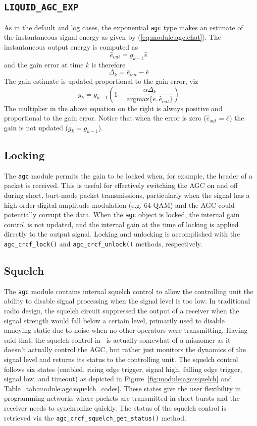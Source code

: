 \subsection{{\tt LIQUID\_AGC\_EXP}}
\label{module:agc:exp}
As in the default and log cases, the exponential {\tt agc} type makes an
estimate of the instantaneous signal energy as given by
(\ref{eq:module:agc:ehat}).
The instantaneous output energy is computed as
\[
    \hat{e}_{out} = g_{k-1} \hat{e}
\]
and the gain error at time $k$ is therefore
\[
    \Delta_k = \hat{e}_{out} - \bar{e}
\]
The gain estimate is updated proportional to the gain error, viz
\[
    g_k =
        g_{k-1} \left(1 -
         \frac{
            \alpha \Delta_k
        }{
            \text{argmax}\bigl\{\bar{e}, \hat{e}_{out} \bigr\}
        }
    \right)
\]
The multiplier in the above equation on the right is always positive and
proportional to the gain error.
Notice that when the error is zero ($\hat{e}_{out} = \bar{e}$) the gain is not
updated ($g_k = g_{k-1}$).


\subsection{Locking}
The {\tt agc} module permits the gain to be locked when, for example, the
header of a packet is received.
This is useful for effectively switching the AGC on and off during short,
burt-mode packet transmissions, particularly when the signal has a high-order
digital amplitude-modulation (e.g. 64-QAM) and the AGC could potentially
corrupt the data.
When the {\tt agc} object is locked, the internal gain control is not updated,
and the internal gain at the time of locking is applied directly to the output
signal.
%
Locking and unlocking is accomplished with the
{\tt agc\_crcf\_lock()} and
{\tt agc\_crcf\_unlock()} methods, respectively.

\subsection{Squelch}
The {\tt agc} module contains internal squelch control to allow the
controlling unit the ability to disable signal processing when the signal
level is too low.
In traditional radio design, the squelch circuit suppressed the
output of a receiver when the signal strength would fall below a certain level,
primarily used to disable annoying static due to noise when no other operators
were transmitting.
Having said that, the squelch control in \liquid\ is actually somewhat of a
misnomer as it doesn't actually control the AGC, but rather just monitors the
dynamics of the signal level and returns its status to the controlling unit.
The squelch control follows six states
(enabled, rising edge trigger, signal high, falling edge trigger,
signal low, and timeout)
as depicted in
Figure~\ref{fig:module:agc:squelch} and
Table~\ref{tab:module:agc:squelch_codes}.
These states give the user flexibility in programming networks where packets
are transmitted in short bursts and the receiver needs to synchronize quickly.
The status of the squelch control is retrieved via the
{\tt agc\_crcf\_squelch\_get\_status()} method.

